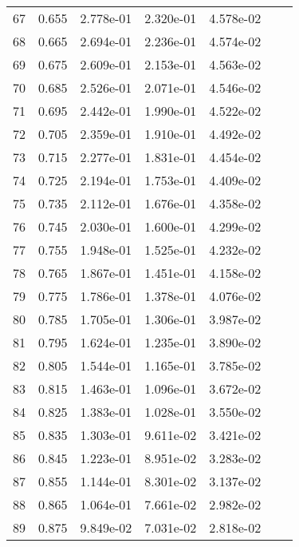\begin{table}[ht]
\begin{tabular}{rcccccc}
    67 &  0.655 &       2.778e-01 &       2.320e-01  &        4.578e-02\\ 
    68 &  0.665 &       2.694e-01 &       2.236e-01  &        4.574e-02\\ 
    69 &  0.675 &       2.609e-01 &       2.153e-01  &        4.563e-02\\ 
    70 &  0.685 &       2.526e-01 &       2.071e-01  &        4.546e-02\\ 
    71 &  0.695 &       2.442e-01 &       1.990e-01  &        4.522e-02\\ 
    72 &  0.705 &       2.359e-01 &       1.910e-01  &        4.492e-02\\ 
    73 &  0.715 &       2.277e-01 &       1.831e-01  &        4.454e-02\\ 
    74 &  0.725 &       2.194e-01 &       1.753e-01  &        4.409e-02\\ 
    75 &  0.735 &       2.112e-01 &       1.676e-01  &        4.358e-02\\ 
    76 &  0.745 &       2.030e-01 &       1.600e-01  &        4.299e-02\\ 
    77 &  0.755 &       1.948e-01 &       1.525e-01  &        4.232e-02\\ 
    78 &  0.765 &       1.867e-01 &       1.451e-01  &        4.158e-02\\ 
    79 &  0.775 &       1.786e-01 &       1.378e-01  &        4.076e-02\\ 
    80 &  0.785 &       1.705e-01 &       1.306e-01  &        3.987e-02\\ 
    81 &  0.795 &       1.624e-01 &       1.235e-01  &        3.890e-02\\ 
    82 &  0.805 &       1.544e-01 &       1.165e-01  &        3.785e-02\\ 
    83 &  0.815 &       1.463e-01 &       1.096e-01  &        3.672e-02\\ 
    84 &  0.825 &       1.383e-01 &       1.028e-01  &        3.550e-02\\ 
    85 &  0.835 &       1.303e-01 &       9.611e-02  &        3.421e-02\\ 
    86 &  0.845 &       1.223e-01 &       8.951e-02  &        3.283e-02\\ 
    87 &  0.855 &       1.144e-01 &       8.301e-02  &        3.137e-02\\ 
    88 &  0.865 &       1.064e-01 &       7.661e-02  &        2.982e-02\\ 
    89 &  0.875 &       9.849e-02 &       7.031e-02  &        2.818e-02\\ 

\end{tabular}
\end{table}
